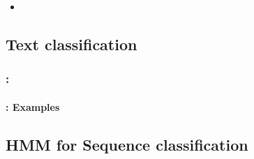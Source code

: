 \documentclass[xcolor=table]{beamer}
\begin{document}
\begin{frame}
	\frametitle{\insertshortsubtitle}
	\framesubtitle{\insertsection}
	
	\begin{itemize}
		\item 
	\end{itemize}
	
\end{frame}


\subsection{Text classification}

\begin{frame}
	\frametitle{\insertshortsubtitle: \insertsection}
	\framesubtitle{\insertsubsection: Examples}
	
	
\end{frame}

\subsection{HMM for Sequence classification}
\end{document}
